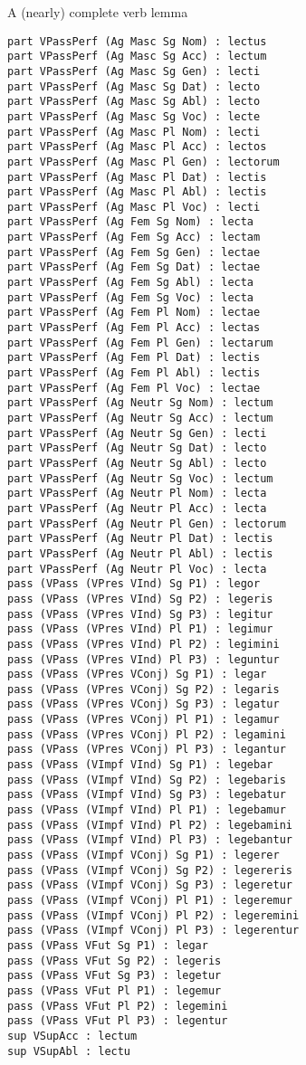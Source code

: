 \documentclass{beamer}
\begin{document}
\begin{frame}[fragile]{A (nearly) complete verb lemma}
\begin{example}
\begin{multicols}{5}
{\begin{Verbatim}
part VPassPerf (Ag Masc Sg Nom) : lectus
part VPassPerf (Ag Masc Sg Acc) : lectum
part VPassPerf (Ag Masc Sg Gen) : lecti
part VPassPerf (Ag Masc Sg Dat) : lecto
part VPassPerf (Ag Masc Sg Abl) : lecto
part VPassPerf (Ag Masc Sg Voc) : lecte
part VPassPerf (Ag Masc Pl Nom) : lecti
part VPassPerf (Ag Masc Pl Acc) : lectos
part VPassPerf (Ag Masc Pl Gen) : lectorum
part VPassPerf (Ag Masc Pl Dat) : lectis
part VPassPerf (Ag Masc Pl Abl) : lectis
part VPassPerf (Ag Masc Pl Voc) : lecti
part VPassPerf (Ag Fem Sg Nom) : lecta
part VPassPerf (Ag Fem Sg Acc) : lectam
part VPassPerf (Ag Fem Sg Gen) : lectae
part VPassPerf (Ag Fem Sg Dat) : lectae
part VPassPerf (Ag Fem Sg Abl) : lecta
part VPassPerf (Ag Fem Sg Voc) : lecta
part VPassPerf (Ag Fem Pl Nom) : lectae
part VPassPerf (Ag Fem Pl Acc) : lectas
part VPassPerf (Ag Fem Pl Gen) : lectarum
part VPassPerf (Ag Fem Pl Dat) : lectis
part VPassPerf (Ag Fem Pl Abl) : lectis
part VPassPerf (Ag Fem Pl Voc) : lectae
part VPassPerf (Ag Neutr Sg Nom) : lectum
part VPassPerf (Ag Neutr Sg Acc) : lectum
part VPassPerf (Ag Neutr Sg Gen) : lecti
part VPassPerf (Ag Neutr Sg Dat) : lecto
part VPassPerf (Ag Neutr Sg Abl) : lecto
part VPassPerf (Ag Neutr Sg Voc) : lectum
part VPassPerf (Ag Neutr Pl Nom) : lecta
part VPassPerf (Ag Neutr Pl Acc) : lecta
part VPassPerf (Ag Neutr Pl Gen) : lectorum
part VPassPerf (Ag Neutr Pl Dat) : lectis
part VPassPerf (Ag Neutr Pl Abl) : lectis
part VPassPerf (Ag Neutr Pl Voc) : lecta
pass (VPass (VPres VInd) Sg P1) : legor
pass (VPass (VPres VInd) Sg P2) : legeris
pass (VPass (VPres VInd) Sg P3) : legitur
pass (VPass (VPres VInd) Pl P1) : legimur
pass (VPass (VPres VInd) Pl P2) : legimini
pass (VPass (VPres VInd) Pl P3) : leguntur
pass (VPass (VPres VConj) Sg P1) : legar
pass (VPass (VPres VConj) Sg P2) : legaris
pass (VPass (VPres VConj) Sg P3) : legatur
pass (VPass (VPres VConj) Pl P1) : legamur
pass (VPass (VPres VConj) Pl P2) : legamini
pass (VPass (VPres VConj) Pl P3) : legantur
pass (VPass (VImpf VInd) Sg P1) : legebar
pass (VPass (VImpf VInd) Sg P2) : legebaris
pass (VPass (VImpf VInd) Sg P3) : legebatur
pass (VPass (VImpf VInd) Pl P1) : legebamur
pass (VPass (VImpf VInd) Pl P2) : legebamini
pass (VPass (VImpf VInd) Pl P3) : legebantur
pass (VPass (VImpf VConj) Sg P1) : legerer
pass (VPass (VImpf VConj) Sg P2) : legereris
pass (VPass (VImpf VConj) Sg P3) : legeretur
pass (VPass (VImpf VConj) Pl P1) : legeremur
pass (VPass (VImpf VConj) Pl P2) : legeremini
pass (VPass (VImpf VConj) Pl P3) : legerentur
pass (VPass VFut Sg P1) : legar
pass (VPass VFut Sg P2) : legeris
pass (VPass VFut Sg P3) : legetur
pass (VPass VFut Pl P1) : legemur
pass (VPass VFut Pl P2) : legemini
pass (VPass VFut Pl P3) : legentur
sup VSupAcc : lectum
sup VSupAbl : lectu
\end{Verbatim}
}
\end{multicols}
\end{example}
\end{frame}
\end{document}
